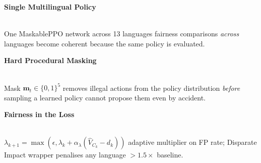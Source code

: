 \documentclass[25pt, a0paper, portrait, margin=0mm, innermargin=15mm,
     blockverticalspace=6mm, colspace=14mm, subcolspace=6mm]{tikzposter}
\begin{document}
{\vspace{2mm}
\begin{minipage}[t]{0.32\linewidth}
\centering
\colorbox{munavy}{\parbox{0.95\linewidth}{\centering\color{white}\vspace{1mm}\textbf{\large Single Multilingual Policy}\vspace{1mm}}}\\[2mm]
\normalsize One MaskablePPO network across 13 languages fairness comparisons \textit{across} languages become coherent because the same policy is evaluated.
\end{minipage}\hfill
\begin{minipage}[t]{0.32\linewidth}
\centering
\colorbox{muaccent}{\parbox{0.95\linewidth}{\centering\color{white}\vspace{1mm}\textbf{\large Hard Procedural Masking}\vspace{1mm}}}\\[2mm]
\normalsize Mask $\mathbf{m}_t \in \{0,1\}^5$ removes illegal actions from the policy distribution \textit{before} sampling a learned policy cannot propose them even by accident.
\end{minipage}\hfill
\begin{minipage}[t]{0.32\linewidth}
\centering
\colorbox{mugreen}{\parbox{0.95\linewidth}{\centering\color{white}\vspace{1mm}\textbf{\large Fairness in the Loss}\vspace{1mm}}}\\[2mm]
\normalsize $\lambda_{k+1} = \max(\epsilon,\lambda_k+\alpha_\lambda(\hat{V}_{C_k}-d_k))$ adaptive multiplier on FP rate; Disparate Impact wrapper penalises any language $> 1.5\times$ baseline.
\end{minipage}
}
\end{document}
